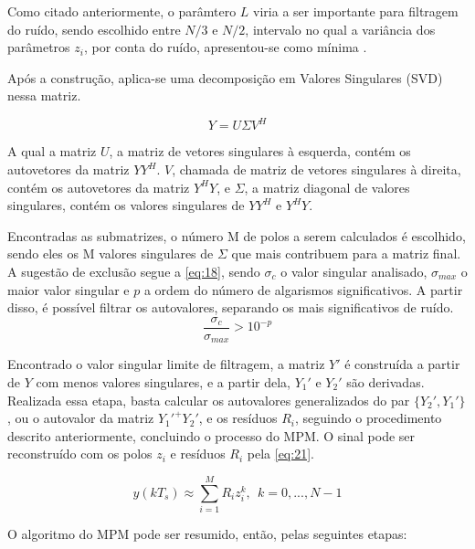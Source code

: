 \documentclass[12pt]{article}
\begin{document}
Como citado anteriormente, o parâmtero $L$ viria a ser importante para filtragem do ruído, sendo escolhido entre $N/3$ e $N/2$, intervalo no qual 
a variância dos parâmetros $z_i$, por conta do ruído, apresentou-se como mínima \cite{370583}.

Após a construção, aplica-se uma decomposição em Valores Singulares (SVD) nessa matriz. 

\begin{equation} \label{eq:17}
    Y = U \Sigma V^H
\end{equation}

A qual a matriz $U$, a matriz de vetores singulares à esquerda, contém os autovetores da matriz $YY^H$. $V$, chamada de matriz de vetores singulares 
à direita, contém os autovetores da matriz $Y^HY$, e $\Sigma$, a matriz diagonal de valores singulares, contém os valores singulares de $YY^H$ e $Y^HY$.

Encontradas as submatrizes, o número M de polos a serem calculados é escolhido, sendo eles os M valores singulares de $\Sigma$ que mais contribuem para a matriz final. 
A sugestão de exclusão segue a \autoref{eq:18}, sendo $\sigma_c$ o valor singular analisado, $\sigma _{max}$ o maior valor singular e $p$ a ordem do número de algarismos significativos. 
A partir disso, é possível filtrar os autovalores, separando os mais significativos de ruído.
\begin{equation} \label{eq:18}
    \frac{\sigma_c}{\sigma _{max}} > 10^{-p}
\end{equation}

Encontrado o valor singular limite de filtragem, a matriz $Y'$ é construída a partir de $Y$ com menos valores singulares, e a partir dela, $Y_1'$ e $Y_2'$ são derivadas. Realizada essa etapa, 
basta calcular os autovalores generalizados do par $\{Y_2', Y_1'\}$, ou o autovalor da matriz $Y_1'^+Y_2'$, e os resíduos $R_i$, seguindo o procedimento descrito anteriormente,
concluindo o processo do MPM. O sinal pode ser reconstruído com os polos $z_i$ e resíduos $R_i$ pela \autoref{eq:21}.

\begin{equation} \label{eq:21}
    y(kT_s) \approx \sum_{i = 1}^{M}R_i z_i^{k}, \ \ k = 0,...,N-1
\end{equation}

O algoritmo do MPM pode ser resumido, então, pelas seguintes etapas:
\end{document}
